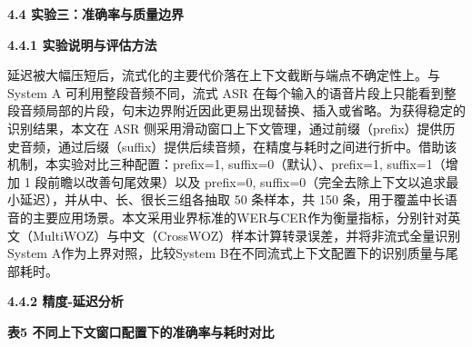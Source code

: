 \documentclass[
]{article}
\begin{document}
\textbf{4.4 实验三：准确率与质量边界}

\textbf{4.4.1 实验说明与评估方法}

延迟被大幅压短后，流式化的主要代价落在上下文截断与端点不确定性上。与 System A 可利用整段音频不同，流式 ASR 在每个输入的语音片段上只能看到整段音频局部的片段，句末边界附近因此更易出现替换、插入或省略。为获得稳定的识别结果，本文在 ASR 侧采用滑动窗口上下文管理，通过前缀（prefix）提供历史音频，通过后缀（suffix）提供后续音频，在精度与耗时之间进行折中。借助该机制，本实验对比三种配置：prefix=1, suffix=0（默认）、prefix=1, suffix=1（增加 1 段前瞻以改善句尾效果）以及 prefix=0, suffix=0（完全去除上下文以追求最小延迟），并从中、长、很长三组各抽取 50 条样本，共 150 条，用于覆盖中长语音的主要应用场景。本文采用业界标准的WER与CER作为衡量指标，分别针对英文（MultiWOZ）与中文（CrossWOZ）样本计算转录误差，并将非流式全量识别System A作为上界对照，比较System B在不同流式上下文配置下的识别质量与尾部耗时。

\textbf{4.4.2 精度-延迟分析}

\textbf{表5 不同上下文窗口配置下的准确率与耗时对比}
\end{document}
